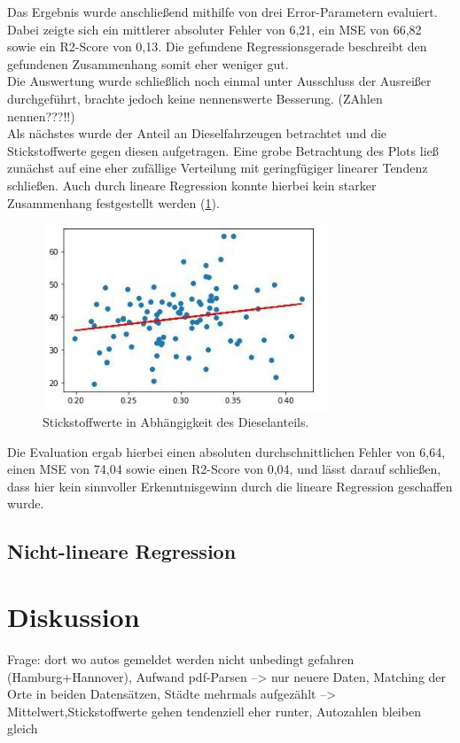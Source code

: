 \documentclass[11pt,a4paper,oneside,german]{article}
\begin{document}
Das Ergebnis wurde anschließend mithilfe von drei Error-Parametern evaluiert. Dabei zeigte sich ein mittlerer absoluter Fehler von 6,21, ein MSE von 66,82 sowie ein R2-Score von 0,13. Die gefundene Regressionsgerade beschreibt den gefundenen Zusammenhang somit eher weniger gut. \\
Die Auswertung wurde schließlich noch einmal unter Ausschluss der Ausreißer durchgeführt, brachte jedoch keine nennenswerte Besserung. (ZAhlen nennen???!!) \\
Als nächstes wurde der Anteil an Dieselfahrzeugen betrachtet und die Stickstoffwerte gegen diesen aufgetragen. Eine grobe Betrachtung des Plots ließ zunächst auf eine eher zufällige Verteilung mit geringfügiger linearer Tendenz schließen. Auch durch lineare Regression konnte hierbei kein starker Zusammenhang festgestellt werden (\ref{fig:linregdieselanteil}).

\begin{figure}[h!]
	\centering
	\includegraphics[width=8.5cm]{linregdieselanteil.jpg}
	\caption{Stickstoffwerte in Abhängigkeit des Dieselanteils.}
	\label{fig:linregdieselanteil}
\end{figure}

Die Evaluation ergab hierbei einen absoluten durchschnittlichen Fehler von 6,64, einen MSE von 74,04 sowie einen R2-Score von 0,04, und lässt darauf schließen, dass hier kein sinnvoller Erkenntnisgewinn durch die lineare Regression geschaffen wurde.

\subsection{Nicht-lineare Regression}

\section{Diskussion}



Frage: dort wo autos gemeldet werden nicht unbedingt gefahren (Hamburg+Hannover), Aufwand pdf-Parsen --> nur neuere Daten, Matching der Orte in beiden Datensätzen, Städte mehrmals aufgezählt --> Mittelwert,Stickstoffwerte gehen tendenziell eher runter, Autozahlen bleiben gleich
\end{document}
